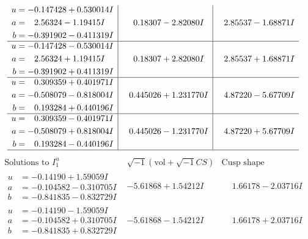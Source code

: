 \documentclass[1p]{elsarticle_modified}
\theoremstyle{definition}
\newcommand{\I}{\sqrt{-1}}
\begin{document}
$$\begin{array}{c|c|c}
\begin{aligned}
u &= -0.147428 + 0.530014 I \\
a &= \phantom{-}2.56324 - 1.19415 I \\
b &= -0.391902 - 0.411319 I\end{aligned}
 & \phantom{-}0.18307 - 2.82080 I & \phantom{-}2.85537 - 1.68871 I \\ \hline\begin{aligned}
u &= -0.147428 - 0.530014 I \\
a &= \phantom{-}2.56324 + 1.19415 I \\
b &= -0.391902 + 0.411319 I\end{aligned}
 & \phantom{-}0.18307 + 2.82080 I & \phantom{-}2.85537 + 1.68871 I \\ \hline\begin{aligned}
u &= \phantom{-}0.309359 + 0.401971 I \\
a &= -0.508079 - 0.818004 I \\
b &= \phantom{-}0.193284 + 0.440196 I\end{aligned}
 & \phantom{-}0.445026 + 1.231770 I & \phantom{-}4.87220 - 5.67709 I \\ \hline\begin{aligned}
u &= \phantom{-}0.309359 - 0.401971 I \\
a &= -0.508079 + 0.818004 I \\
b &= \phantom{-}0.193284 - 0.440196 I\end{aligned}
 & \phantom{-}0.445026 - 1.231770 I & \phantom{-}4.87220 + 5.67709 I\\
 \hline 
 \end{array}$$\newpage$$\begin{array}{c|c|c}  
\text{Solutions to }I^u_{1}& \I (\text{vol} + \sqrt{-1}CS) & \text{Cusp shape}\\
 \hline 
\begin{aligned}
u &= -0.14190 + 1.59059 I \\
a &= -0.104582 - 0.310705 I \\
b &= -0.841835 - 0.832729 I\end{aligned}
 & -5.61868 + 1.54212 I & \phantom{-}1.66178 - 2.03716 I \\ \hline\begin{aligned}
u &= -0.14190 - 1.59059 I \\
a &= -0.104582 + 0.310705 I \\
b &= -0.841835 + 0.832729 I\end{aligned}
 & -5.61868 - 1.54212 I & \phantom{-}1.66178 + 2.03716 I \\ \hline\begin{aligned}

\end{aligned}
\end{array}$$
\end{document}
